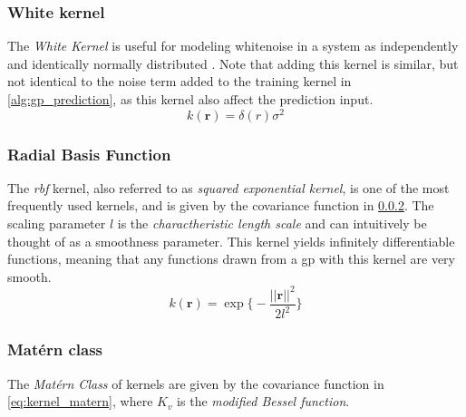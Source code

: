 \subsubsection{White kernel}
The \textit{White Kernel} is useful for modeling whitenoise in a system as independently and identically normally distributed \cite{scikit-learn}. Note that adding this kernel is similar, but not identical to the noise term added to the training kernel in \cref{alg:gp_prediction}, as this kernel also affect the prediction input. 
\begin{equation}
    k(\boldsymbol{r}) = \delta (r) \sigma^2
\end{equation}

\subsubsection{Radial Basis Function}\label{sec:kernels_rbf}
The \textit{\acrfull{rbf}} kernel, also referred to as \textit{squared exponential kernel}, is one of the most frequently used kernels, and is given by the covariance function in \cref{sec:kernels_rbf}. The scaling parameter $l$ is the \textit{charactheristic length scale} and can intuitively be thought of as a smoothness parameter. This kernel yields infinitely differentiable functions, meaning that any functions drawn from a \acrshort{gp} with this kernel are very smooth\cite{rasmussen}.
\begin{equation}\label{eq:kernel_rbf}
    k(\boldsymbol{r}) = \exp \big\{-\frac{||\boldsymbol{r}||^2}{2 l^2}\big\}
\end{equation} 

\subsubsection{Matérn class}
The \textit{Matérn Class} of kernels are given by the covariance function in \cref{eq:kernel_matern}, where $K_v$ is the \textit{modified Bessel function}. 

